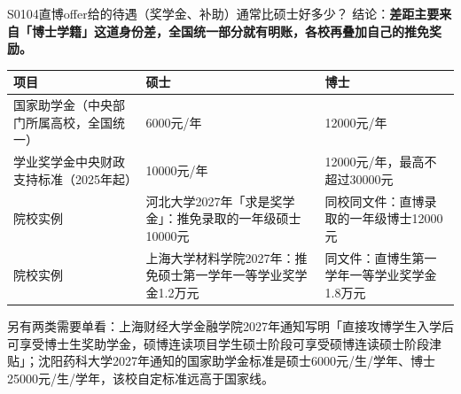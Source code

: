 \begin{qa}{S0104}{直博offer给的待遇（奖学金、补助）通常比硕士好多少？}
结论：\textbf{差距主要来自「博士学籍」这道身份差，全国统一部分就有明账，各校再叠加自己的推免奖励。}

\par\vspace{2pt}\nobreak\begin{center}\footnotesize
\begin{tabularx}{\textwidth}{>{\raggedright\arraybackslash}X>{\raggedright\arraybackslash}X>{\raggedright\arraybackslash}X}
\toprule
\textbf{项目} & \textbf{硕士} & \textbf{博士} \\ \midrule
国家助学金（中央部门所属高校，全国统一） & 6000元/年 & 12000元/年 \\
学业奖学金中央财政支持标准（2025年起） & 10000元/年 & 12000元/年，最高不超过30000元 \\
院校实例 & 河北大学2027年「求是奖学金」：推免录取的一年级硕士10000元 & 同校同文件：直博录取的一年级博士12000元 \\
院校实例 & 上海大学材料学院2027年：推免硕士第一学年一等学业奖学金1.2万元 & 同文件：直博生第一学年一等学业奖学金1.8万元 \\
\bottomrule
\end{tabularx}
\end{center}\vspace{2pt}\par

另有两类需要单看：上海财经大学金融学院2027年通知写明「直接攻博学生入学后可享受博士生奖助学金，硕博连读项目学生硕士阶段可享受硕博连读硕士阶段津贴」；沈阳药科大学2027年通知的国家助学金标准是硕士6000元/生/学年、博士25000元/生/学年，该校自定标准远高于国家线。
\end{qa}

